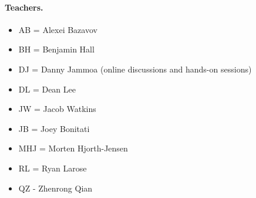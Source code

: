 \documentclass[%
oneside,                 %
final,                   %
10pt]{article}
\begin{document}
\paragraph{Teachers.}
\begin{itemize}
\item AB = Alexei Bazavov

\item BH = Benjamin Hall

\item DJ = Danny Jammoa (online discussions and hands-on sessions)

\item DL = Dean Lee

\item JW = Jacob Watkins

\item JB = Joey Bonitati

\item MHJ = Morten Hjorth-Jensen

\item RL = Ryan Larose

\item QZ - Zhenrong Qian
\end{itemize}

\noindent
\end{document}
